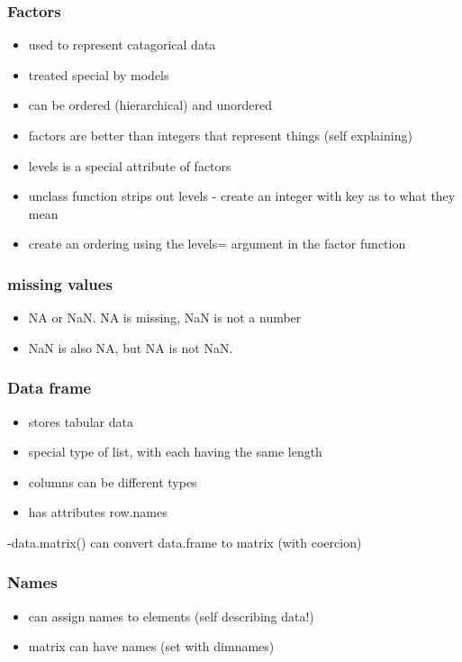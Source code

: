 \documentclass[11pt]{article}
\begin{document}
\subsubsection{Factors}
\label{sec-1-4-8}

\begin{itemize}
\item used to represent catagorical data
\item treated special by models
\item can be ordered (hierarchical) and unordered
\item factors are better than integers that represent things (self
  explaining)
\item levels is a special attribute of factors
\item unclass function strips out levels - create an integer with key as
  to what they mean
\item create an ordering using the levels= argument in the factor function
\end{itemize}
\subsubsection{missing values}
\label{sec-1-4-9}

\begin{itemize}
\item NA or NaN. NA is missing, NaN is not a number
\item NaN is also NA, but NA is not NaN.
\end{itemize}
\subsubsection{Data frame}
\label{sec-1-4-10}

\begin{itemize}
\item stores tabular data
\item special type of list, with each having the same length
\item columns can be different types
\item has attributes row.names
\end{itemize}
-data.matrix() can convert data.frame to matrix (with coercion)
\subsubsection{Names}
\label{sec-1-4-11}

\begin{itemize}
\item can assign names to elements (self describing data!)
\item matrix can have names (set with dimnames)
\end{itemize}
\end{document}
